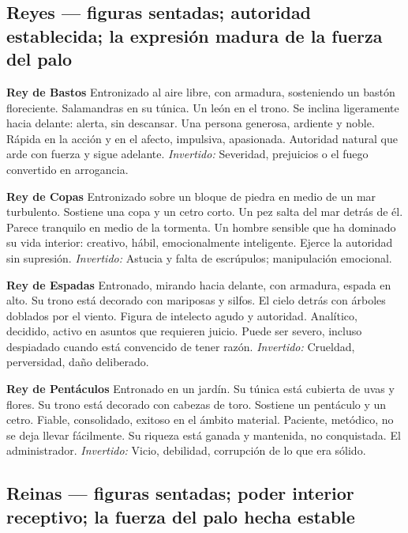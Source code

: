\subsection{Reyes --- figuras sentadas; autoridad establecida; la expresión madura de la fuerza del palo}\label{kings--seated-figures-established-authority-the-mature-expression-of-the-suits-force}

\textbf{Rey de Bastos} Entronizado al aire libre, con armadura, sosteniendo un bastón floreciente. Salamandras en su túnica. Un león en el trono. Se inclina ligeramente hacia delante: alerta, sin descansar. Una persona generosa, ardiente y noble. Rápida en la acción y en el afecto, impulsiva, apasionada. Autoridad natural que arde con fuerza y sigue adelante. \emph{Invertido:} Severidad, prejuicios o el fuego convertido en arrogancia.

\textbf{Rey de Copas} Entronizado sobre un bloque de piedra en medio de un mar turbulento. Sostiene una copa y un cetro corto. Un pez salta del mar detrás de él. Parece tranquilo en medio de la tormenta. Un hombre sensible que ha dominado su vida interior: creativo, hábil, emocionalmente inteligente. Ejerce la autoridad sin supresión. \emph{Invertido:} Astucia y falta de escrúpulos; manipulación emocional.

\textbf{Rey de Espadas} Entronado, mirando hacia delante, con armadura, espada en alto. Su trono está decorado con mariposas y silfos. El cielo detrás con árboles doblados por el viento. Figura de intelecto agudo y autoridad. Analítico, decidido, activo en asuntos que requieren juicio. Puede ser severo, incluso despiadado cuando está convencido de tener razón. \emph{Invertido:} Crueldad, perversidad, daño deliberado.

\textbf{Rey de Pentáculos} Entronado en un jardín. Su túnica está cubierta de uvas y flores. Su trono está decorado con cabezas de toro. Sostiene un pentáculo y un cetro. Fiable, consolidado, exitoso en el ámbito material. Paciente, metódico, no se deja llevar fácilmente. Su riqueza está ganada y mantenida, no conquistada. El administrador. \emph{Invertido:} Vicio, debilidad, corrupción de lo que era sólido.

\subsection{Reinas --- figuras sentadas; poder interior receptivo; la fuerza del palo hecha estable}\label{queens--seated-figures-receptive-interior-power-the-suits-force-made-stable}

